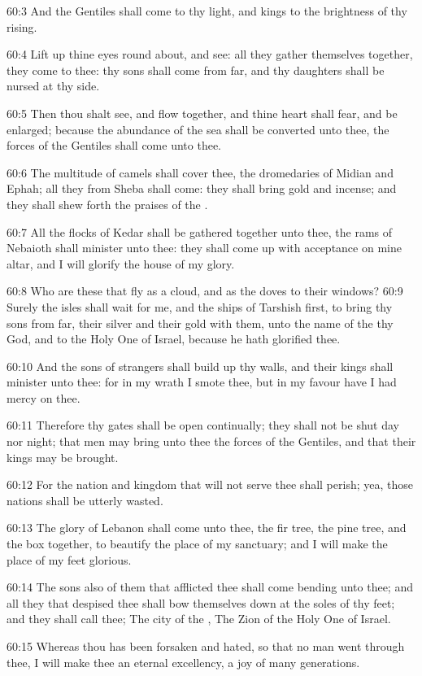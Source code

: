60:3 And the Gentiles shall come to thy light, and kings to the brightness of thy rising.

60:4 Lift up thine eyes round about, and see: all they gather themselves together, they come to thee: thy sons shall come from far, and thy daughters shall be nursed at thy side.

60:5 Then thou shalt see, and flow together, and thine heart shall fear, and be enlarged; because the abundance of the sea shall be converted unto thee, the forces of the Gentiles shall come unto thee.

60:6 The multitude of camels shall cover thee, the dromedaries of Midian and Ephah; all they from Sheba shall come: they shall bring gold and incense; and they shall shew forth the praises of the \LORD.

60:7 All the flocks of Kedar shall be gathered together unto thee, the rams of Nebaioth shall minister unto thee: they shall come up with acceptance on mine altar, and I will glorify the house of my glory.

60:8 Who are these that fly as a cloud, and as the doves to their windows?  60:9 Surely the isles shall wait for me, and the ships of Tarshish first, to bring thy sons from far, their silver and their gold with them, unto the name of the \LORD thy God, and to the Holy One of Israel, because he hath glorified thee.

60:10 And the sons of strangers shall build up thy walls, and their kings shall minister unto thee: for in my wrath I smote thee, but in my favour have I had mercy on thee.

60:11 Therefore thy gates shall be open continually; they shall not be shut day nor night; that men may bring unto thee the forces of the Gentiles, and that their kings may be brought.

60:12 For the nation and kingdom that will not serve thee shall perish; yea, those nations shall be utterly wasted.

60:13 The glory of Lebanon shall come unto thee, the fir tree, the pine tree, and the box together, to beautify the place of my sanctuary; and I will make the place of my feet glorious.

60:14 The sons also of them that afflicted thee shall come bending unto thee; and all they that despised thee shall bow themselves down at the soles of thy feet; and they shall call thee; The city of the \LORD, The Zion of the Holy One of Israel.

60:15 Whereas thou has been forsaken and hated, so that no man went through thee, I will make thee an eternal excellency, a joy of many generations.

